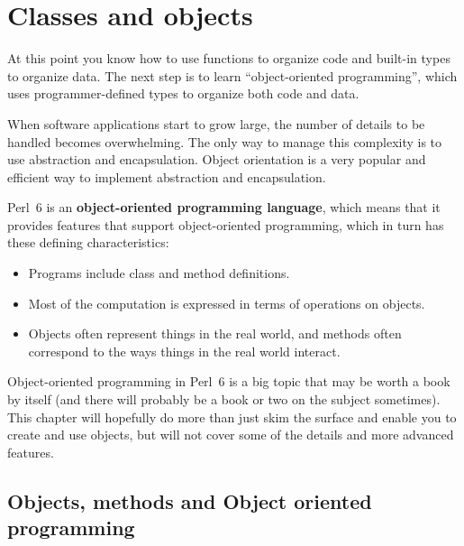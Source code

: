 \chapter{Classes and objects}
\label{objects}


At this point you know how to use functions to organize code and 
built-in types to organize data.  The next step is to learn
``object-oriented programming'', which uses programmer-defined types
to organize both code and data.

When software applications start to grow large, the number of 
details to be handled becomes overwhelming. The only 
way to manage this complexity is to use abstraction and 
encapsulation. Object orientation is a very popular and efficient 
way to implement abstraction and encapsulation.

Perl~6 is an {\bf object-oriented programming language}, which means
that it provides features that support object-oriented
programming, which in turn has these defining characteristics:

\begin{itemize}

\item Programs include class and method definitions.

\item Most of the computation is expressed in terms of operations on
  objects.

\item Objects often represent things in the real world, and methods 
often correspond to the ways things in the real world interact.

\end{itemize}


Object-oriented programming in 
Perl~6 is a big topic that may be worth a book by itself (and 
there will probably be a book or two on the subject sometimes). This 
chapter will hopefully do more than just skim the surface 
and enable you to create and use objects, but will not 
cover some of the details and more advanced features.

\section{Objects, methods and Object oriented programming}

